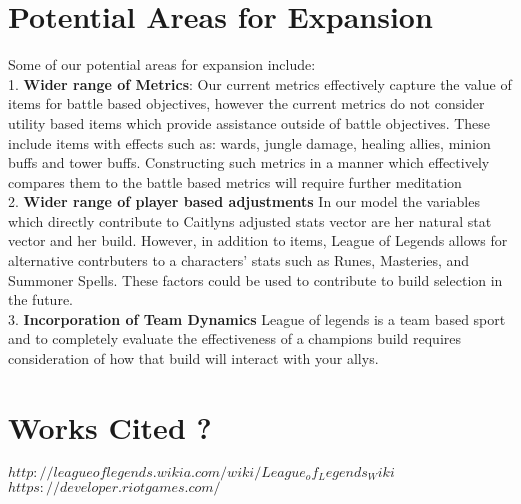 \documentclass{article}
\begin{document}
\section{Potential Areas for Expansion}
Some of our potential areas for expansion include:\\
1. {\bf Wider range of Metrics}: Our current metrics effectively capture the value of items for battle based objectives, however the current metrics do not consider utility based items which provide assistance outside of battle objectives.  These include items with effects such as: wards, jungle damage, healing allies, minion buffs and tower buffs.  Constructing such metrics in a manner which effectively compares them to the battle based metrics will require further meditation\\
2. {\bf Wider range of player based adjustments}  In our model the variables which directly contribute to Caitlyns adjusted stats vector are her natural stat vector and her build. However, in addition to items, League of Legends allows for alternative contrbuters to a characters' stats such as Runes, Masteries, and Summoner Spells.  These factors could be used to contribute to build selection in the future.\\
3. {\bf Incorporation of Team Dynamics} League of legends is a team based sport and to completely evaluate the effectiveness of a champions build requires consideration of how that build will interact with your allys.  
\newpage
\section{Works Cited ?}
$http://leagueoflegends.wikia.com/wiki/League_of_Legends_Wiki$\\
$https://developer.riotgames.com/$
\end{document}

